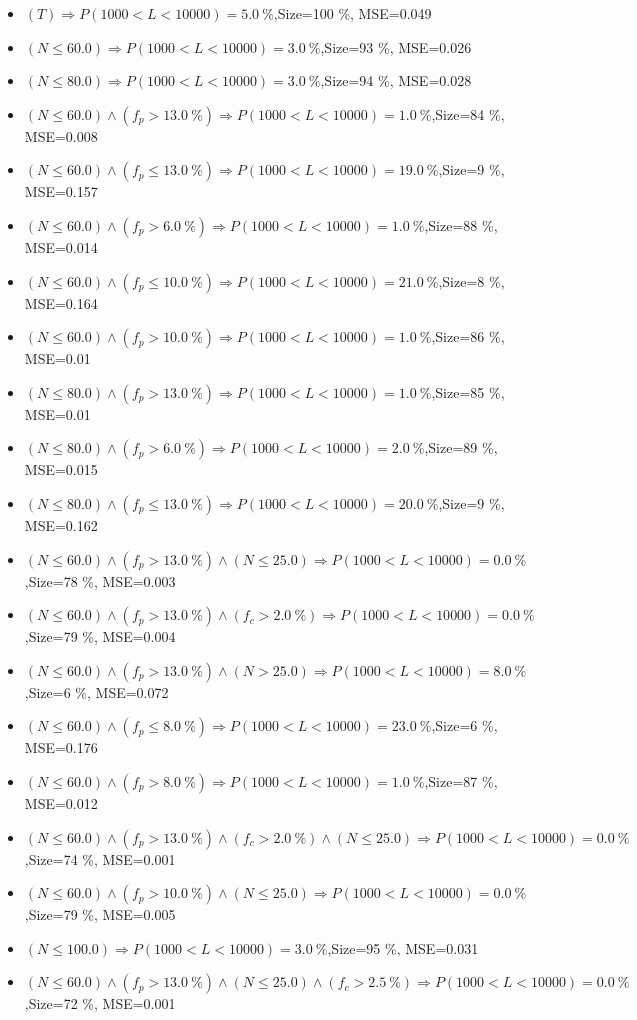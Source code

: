 \documentclass[numbered]{CSL}
\begin{document}
\begin{itemize}
\item $(T) \Rightarrow P(1 000 < L < 10 000) = 5.0~\%$,\hfill Size=100 \%, MSE=0.049
\item $(N \leq 60.0) \Rightarrow P(1 000 < L < 10 000) = 3.0~\%$,\hfill Size=93 \%, MSE=0.026
\item $(N \leq 80.0) \Rightarrow P(1 000 < L < 10 000) = 3.0~\%$,\hfill Size=94 \%, MSE=0.028
\item $(N \leq 60.0) \land (f_p > 13.0~\%) \Rightarrow P(1 000 < L < 10 000) = 1.0~\%$,\hfill Size=84 \%, MSE=0.008
\item $(N \leq 60.0) \land (f_p \leq 13.0~\%) \Rightarrow P(1 000 < L < 10 000) = 19.0~\%$,\hfill Size=9 \%, MSE=0.157
\item $(N \leq 60.0) \land (f_p > 6.0~\%) \Rightarrow P(1 000 < L < 10 000) = 1.0~\%$,\hfill Size=88 \%, MSE=0.014
\item $(N \leq 60.0) \land (f_p \leq 10.0~\%) \Rightarrow P(1 000 < L < 10 000) = 21.0~\%$,\hfill Size=8 \%, MSE=0.164
\item $(N \leq 60.0) \land (f_p > 10.0~\%) \Rightarrow P(1 000 < L < 10 000) = 1.0~\%$,\hfill Size=86 \%, MSE=0.01
\item $(N \leq 80.0) \land (f_p > 13.0~\%) \Rightarrow P(1 000 < L < 10 000) = 1.0~\%$,\hfill Size=85 \%, MSE=0.01
\item $(N \leq 80.0) \land (f_p > 6.0~\%) \Rightarrow P(1 000 < L < 10 000) = 2.0~\%$,\hfill Size=89 \%, MSE=0.015
\item $(N \leq 80.0) \land (f_p \leq 13.0~\%) \Rightarrow P(1 000 < L < 10 000) = 20.0~\%$,\hfill Size=9 \%, MSE=0.162
\item $(N \leq 60.0) \land (f_p > 13.0~\%) \land (N \leq 25.0) \Rightarrow P(1 000 < L < 10 000) = 0.0~\%$,\hfill Size=78 \%, MSE=0.003
\item $(N \leq 60.0) \land (f_p > 13.0~\%) \land (f_c > 2.0~\%) \Rightarrow P(1 000 < L < 10 000) = 0.0~\%$,\hfill Size=79 \%, MSE=0.004
\item $(N \leq 60.0) \land (f_p > 13.0~\%) \land (N > 25.0) \Rightarrow P(1 000 < L < 10 000) = 8.0~\%$,\hfill Size=6 \%, MSE=0.072
\item $(N \leq 60.0) \land (f_p \leq 8.0~\%) \Rightarrow P(1 000 < L < 10 000) = 23.0~\%$,\hfill Size=6 \%, MSE=0.176
\item $(N \leq 60.0) \land (f_p > 8.0~\%) \Rightarrow P(1 000 < L < 10 000) = 1.0~\%$,\hfill Size=87 \%, MSE=0.012
\item $(N \leq 60.0) \land (f_p > 13.0~\%) \land (f_c > 2.0~\%) \land (N \leq 25.0) \Rightarrow P(1 000 < L < 10 000) = 0.0~\%$,\hfill Size=74 \%, MSE=0.001
\item $(N \leq 60.0) \land (f_p > 10.0~\%) \land (N \leq 25.0) \Rightarrow P(1 000 < L < 10 000) = 0.0~\%$,\hfill Size=79 \%, MSE=0.005
\item $(N \leq 100.0) \Rightarrow P(1 000 < L < 10 000) = 3.0~\%$,\hfill Size=95 \%, MSE=0.031
\item $(N \leq 60.0) \land (f_p > 13.0~\%) \land (N \leq 25.0) \land (f_c > 2.5~\%) \Rightarrow P(1 000 < L < 10 000) = 0.0~\%$,\hfill Size=72 \%, MSE=0.001
\end{itemize}
\end{document}
